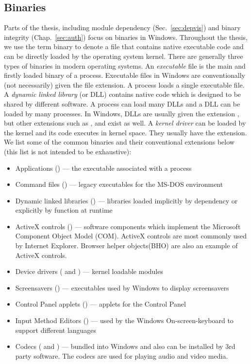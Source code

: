 \subsection{Binaries}
\label{sec:wi-binary}

Parts of the thesis, including module dependency (Sec.~\ref{sec:depvis})
and binary integrity (Chap.~\ref{sec:auth}) focus on binaries in Windows.
Throughout the thesis, we use the term binary to denote a file that contains
native executable code and can be directly loaded by the operating system kernel.
There are generally three types of binaries in modern operating systems.
An {\em executable} file is the main and firstly loaded binary of a process.
Executable files in Windows are conventionally (not necessarily)
given the  file extension.
A process loads a single executable file.
A {\em dynamic linked library} (or DLL) contains native code which is designed
to be shared by different software.
A process can load many DLLs and a DLL can be loaded by many processes.
In Windows, DLLs are usually given the extension , but other extensions
such as ,  and  exist as well.
A {\em kernel driver} can be loaded by the kernel and its code executes in kernel
space.
They usually have the  extension.
We list some of the common binaries and their conventional extensions below
(this list is not intended to be exhaustive):

\begin{itemize}
\item Applications () ---
the executable associated with a process
\item Command files () ---
legacy executables for the MS-DOS environment
\item Dynamic linked libraries () ---
libraries loaded implicitly by dependency or
explicitly by  function at runtime
\item ActiveX controls () ---
software components which
implement the Microsoft Component Object Model (COM). 
ActiveX controls are most commonly used by Internet Explorer.
Browser helper objects(BHO) are also
an example of ActiveX controls.
\item Device drivers ( and ) ---
kernel loadable modules
\item Screensavers () ---
executables used by Windows to display screensavers
\item Control Panel applets () ---
applets for the Control Panel
\item Input Method Editors () ---
used by the Windows On-screen-keyboard to support different languages
\item Codecs ( and ) ---
bundled into Windows and also can be installed by 3rd party software.
The codecs are used for playing audio and video media.
\end{itemize}

